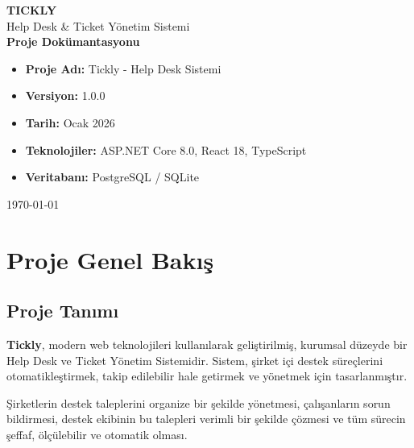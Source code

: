 \documentclass[12pt,a4paper]{article}
\begin{document}
\begin{titlepage}
    \centering
    \vspace*{2cm}
    
    {\Huge \textbf{TICKLY}}\\[0.5cm]
    {\LARGE Help Desk \& Ticket Yönetim Sistemi}\\[2cm]
    
    {\Large \textbf{Proje Dokümantasyonu}}\\[1cm]
    
    \vfill
    
    \begin{tcolorbox}[colback=blue!5!white,colframe=blue!75!black,title=Proje Bilgileri]
        \begin{itemize}[leftmargin=*]
            \item \textbf{Proje Adı:} Tickly - Help Desk Sistemi
            \item \textbf{Versiyon:} 1.0.0
            \item \textbf{Tarih:} Ocak 2026
            \item \textbf{Teknolojiler:} ASP.NET Core 8.0, React 18, TypeScript
            \item \textbf{Veritabanı:} PostgreSQL / SQLite
        \end{itemize}
    \end{tcolorbox}
    
    \vfill
    
    {\large \today}
\end{titlepage}

\tableofcontents
\newpage

\section{Proje Genel Bakış}

\subsection{Proje Tanımı}

\textbf{Tickly}, modern web teknolojileri kullanılarak geliştirilmiş, kurumsal düzeyde bir Help Desk ve Ticket Yönetim Sistemidir. Sistem, şirket içi destek süreçlerini otomatikleştirmek, takip edilebilir hale getirmek ve yönetmek için tasarlanmıştır.

\begin{tcolorbox}[colback=green!5!white,colframe=green!75!black,title=Temel Amaç]
Şirketlerin destek taleplerini organize bir şekilde yönetmesi, çalışanların sorun bildirmesi, destek ekibinin bu talepleri verimli bir şekilde çözmesi ve tüm sürecin şeffaf, ölçülebilir ve otomatik olması.
\end{tcolorbox}
\end{document}

